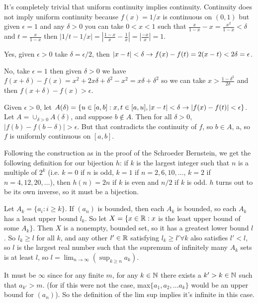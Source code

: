 \documentclass[11pt, oneside]{article}   	%
\begin{document}
\item \be
\item It's completely trivial that uniform continuity implies continuity. Continuity does not imply uniform continuity because $f(x) = 1/x$ is continuous on $(0, 1)$ but given $\epsilon = 1$ and any $\delta > 0$ you can take $0 < x < 1$ such that $\frac{x}{1-x} - x = \frac{x^2}{1-x} < \delta$ and $t = \frac{x}{1-x}$ then $|1/t - 1/x| = |\frac{1-x}{x} - \frac{1}{x}| = |\frac{-x}{x}| = 1$. 
\item Yes, given $\epsilon > 0$ take $\delta = \epsilon / 2$, then $|x - t| < \delta \rightarrow f(x) - f(t) = 2(x - t) < 2\delta = \epsilon$.
\item No, take $\epsilon = 1$ then given $\delta > 0$ we have $f(x + \delta) - f(x) = x^2 + 2x\delta + \delta^2 - x^2 = x\delta + \delta^2$ so we can take $x > \frac{1-\delta^2}{2\delta}$ and then $f(x + \delta) - f(x) > \epsilon$.
\ee
\item Given $\epsilon > 0$, let $A(\delta) = \{u \in [a, b]: x, t \in [a, u], |x - t| < \delta \rightarrow |f(x) - f(t)| < \epsilon\}$. Let $A = \cup_{\delta>0}A(\delta)$, and suppose $b \not \in A$. Then for all $\delta > 0$, $|f(b) - f(b - \delta)| > \epsilon$. But that contradicts the continuity of $f$, so $b \in A$, a, so $f$ is uniformly continuous on $[a, b]$.
\item Following the construction as in the proof of the Schroeder Bernstein, we get the following definition for our bijection $h$: if $k$ is the largest integer such that $n$ is a multiple of $2^k$ (i.e. $k=0$ if $n$ is odd, $k = 1$ if $n = 2, 6, 10, \ldots$, $k = 2$ if $n = 4, 12, 20, \ldots$), then $h(n) = 2n$ if $k$ is even and $n/2$ if $k$ is odd. $h$ turns out to be its own inverse, so it must be a bijection.
\item \be
\item Let $A_k = \{a_i: i \ge k\}$. If $(a_n)$ is bounded, then each $A_k$ is bounded, so each $A_k$ has a least upper bound $l_k$. So let $X = \{x \in \mathbb{R}: x$ is the least upper bound of some $A_k \}$. Then $X$ is a nonempty, bounded set, so it has a greatest lower bound $l$. So $l_k \ge l$ for all $k$, and any other $l' \in \mathbb{R}$ satisfying $l_k \ge l' \forall k$ also satisfies $l' < l$, so $l$ is the largest real number such that the supremum of infinitely many $A_k$ sets is at least $l$, so $l = \lim_{n \to \infty}(\sup_{k \ge n}a_k)$.
\item It must be $\infty$ since for any finite $m$, for any $k \in \mathbb{N}$ there exists a $k' > k \in \mathbb{N}$ such that $a_{k'} > m$. (for if this were not the case, max$\{a_1, a_2, \ldots a_k\}$ would be an upper bound for $(a_n)$). So the definition of the lim sup implies it's infinite in this case.
\end{document}
